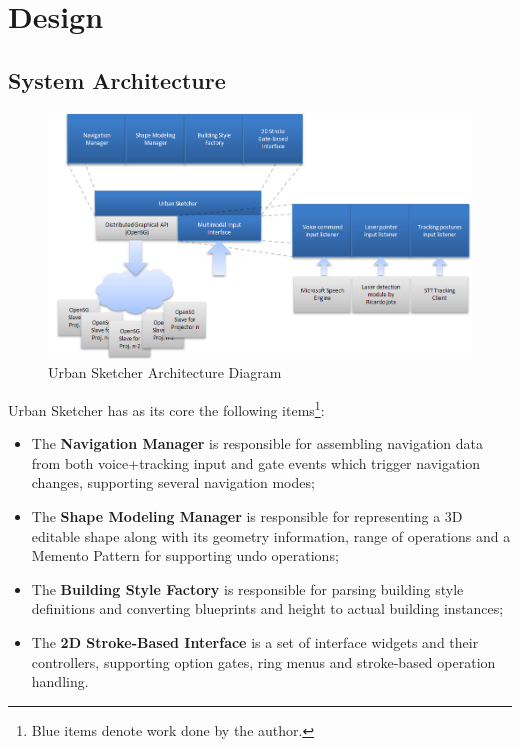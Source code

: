 \chapter{Design}



\section{System Architecture}


\begin{figure}[!ht]
		\centering
		\includegraphics[width=17cm]{gfx/charts/block-diagram.png}
		\caption{Urban Sketcher Architecture Diagram}
		\label{fig:block-diagram}
\end{figure}


Urban Sketcher has as its core the following items\footnote{Blue items denote work done by the author.}:
\begin{itemize}
	\item The \textbf{Navigation Manager} is
		responsible for assembling navigation data from
		both voice+tracking input and gate events which trigger navigation changes,
		supporting several navigation modes;
	
	\item The \textbf{Shape Modeling Manager} is
		responsible for representing a 3D editable shape
		along with its geometry information, range of operations and a
		Memento Pattern for supporting undo operations;
	
	\item The \textbf{Building Style Factory} is
		responsible for parsing building style definitions
		and converting blueprints and height to actual building instances;
	
	\item The \textbf{2D Stroke-Based Interface} is 
		a set of interface widgets and their controllers,
		supporting option gates, ring menus and stroke-based operation handling.
	
\end{itemize}

